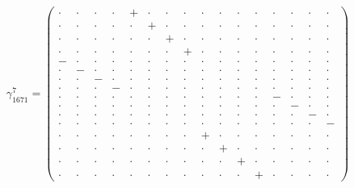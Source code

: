 \documentclass[
  10pt,
]{article}
\begin{document}
\[\gamma_{1671}^7=\left(\begin{smallmatrix} \cdot & \cdot & \cdot & \cdot & + & \cdot & \cdot & \cdot & \cdot & \cdot & \cdot & \cdot & \cdot & \cdot & \cdot & \cdot \\ \cdot & \cdot & \cdot & \cdot & \cdot & + & \cdot & \cdot & \cdot & \cdot & \cdot & \cdot & \cdot & \cdot & \cdot & \cdot \\ \cdot & \cdot & \cdot & \cdot & \cdot & \cdot & + & \cdot & \cdot & \cdot & \cdot & \cdot & \cdot & \cdot & \cdot & \cdot \\ \cdot & \cdot & \cdot & \cdot & \cdot & \cdot & \cdot & + & \cdot & \cdot & \cdot & \cdot & \cdot & \cdot & \cdot & \cdot \\ - & \cdot & \cdot & \cdot & \cdot & \cdot & \cdot & \cdot & \cdot & \cdot & \cdot & \cdot & \cdot & \cdot & \cdot & \cdot \\ \cdot & - & \cdot & \cdot & \cdot & \cdot & \cdot & \cdot & \cdot & \cdot & \cdot & \cdot & \cdot & \cdot & \cdot & \cdot \\ \cdot & \cdot & - & \cdot & \cdot & \cdot & \cdot & \cdot & \cdot & \cdot & \cdot & \cdot & \cdot & \cdot & \cdot & \cdot \\ \cdot & \cdot & \cdot & - & \cdot & \cdot & \cdot & \cdot & \cdot & \cdot & \cdot & \cdot & \cdot & \cdot & \cdot & \cdot \\ \cdot & \cdot & \cdot & \cdot & \cdot & \cdot & \cdot & \cdot & \cdot & \cdot & \cdot & \cdot & - & \cdot & \cdot & \cdot \\ \cdot & \cdot & \cdot & \cdot & \cdot & \cdot & \cdot & \cdot & \cdot & \cdot & \cdot & \cdot & \cdot & - & \cdot & \cdot \\ \cdot & \cdot & \cdot & \cdot & \cdot & \cdot & \cdot & \cdot & \cdot & \cdot & \cdot & \cdot & \cdot & \cdot & - & \cdot \\ \cdot & \cdot & \cdot & \cdot & \cdot & \cdot & \cdot & \cdot & \cdot & \cdot & \cdot & \cdot & \cdot & \cdot & \cdot & - \\ \cdot & \cdot & \cdot & \cdot & \cdot & \cdot & \cdot & \cdot & + & \cdot & \cdot & \cdot & \cdot & \cdot & \cdot & \cdot \\ \cdot & \cdot & \cdot & \cdot & \cdot & \cdot & \cdot & \cdot & \cdot & + & \cdot & \cdot & \cdot & \cdot & \cdot & \cdot \\ \cdot & \cdot & \cdot & \cdot & \cdot & \cdot & \cdot & \cdot & \cdot & \cdot & + & \cdot & \cdot & \cdot & \cdot & \cdot \\ \cdot & \cdot & \cdot & \cdot & \cdot & \cdot & \cdot & \cdot & \cdot & \cdot & \cdot & + & \cdot & \cdot & \cdot & \cdot \end{smallmatrix}\right)\]
\end{document}
